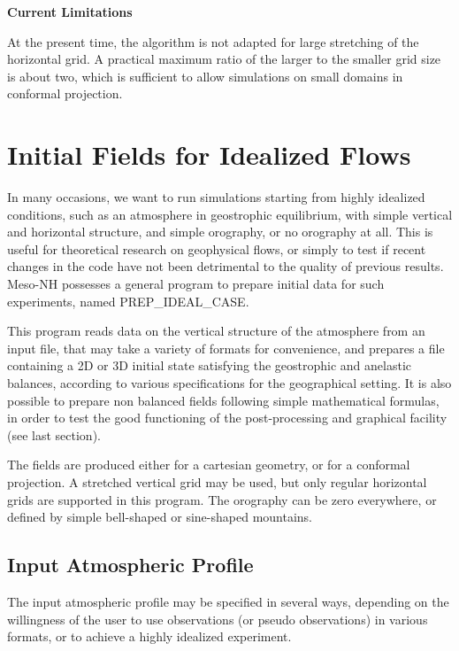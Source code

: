 {\bf Current Limitations}

At the present time, the algorithm is not adapted for large stretching
of the horizontal grid. A practical maximum ratio of the larger to the
smaller grid size is about two, which is sufficient to allow simulations
on small domains in conformal projection.

\chapter{Initial Fields for Idealized Flows}


In many occasions, we want to run simulations starting from highly idealized
conditions, such as an atmosphere in geostrophic equilibrium, with simple
vertical and horizontal structure, and simple orography, or no orography
at all.  This is useful
for theoretical research on geophysical flows, or simply to test if recent
changes in the code have not been detrimental to the quality of previous
results.  Meso-NH possesses a general program to prepare initial data for
such experiments, named PREP\_IDEAL\_CASE.

This program reads data on the
vertical structure of the atmosphere from an input file, that may take a
variety of formats for convenience, and prepares a file containing a 2D or 3D
initial state satisfying the geostrophic and anelastic balances,
according to various specifications for the geographical setting.
It is also possible to prepare non balanced fields following simple mathematical
formulas, in order to test the good functioning of the post-processing
and graphical facility (see last section).

The fields are produced either for a cartesian geometry, or for a conformal
projection.  A stretched vertical grid may be used, but only regular horizontal
grids are supported in this program. The orography can be zero everywhere,
or defined by simple bell-shaped or sine-shaped mountains.

\section{Input Atmospheric Profile}
The input atmospheric profile may be specified in several ways, depending
on the willingness of the user to use observations (or pseudo observations)
in various formats, or to achieve a highly idealized experiment.

